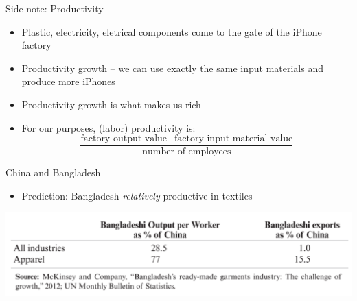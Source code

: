 \documentclass[ignorenonframetext,]{beamer}
\begin{document}
\begin{frame}{Side note: Productivity}

    \begin{itemize}
        \item Plastic, electricity, eletrical components come to the gate of the iPhone factory
        \item Productivity growth -- we can use exactly the same input materials and produce more iPhones
        \item Productivity growth is what makes us rich
        \item For our purposes, (labor) productivity is: 
        \begin{equation*}
            \frac{\mbox{factory output value} - \mbox{factory input material value}}{\mbox{number of employees}}
        \end{equation*}
    \end{itemize}

\end{frame}

\begin{frame}{China and Bangladesh}

    \begin{itemize}
        \item Prediction: Bangladesh \emph{relatively} productive in textiles 
    \end{itemize}
    \includegraphics[scale=0.15]{bangladesh_china_cpa.png}

\end{frame}
\end{document}
